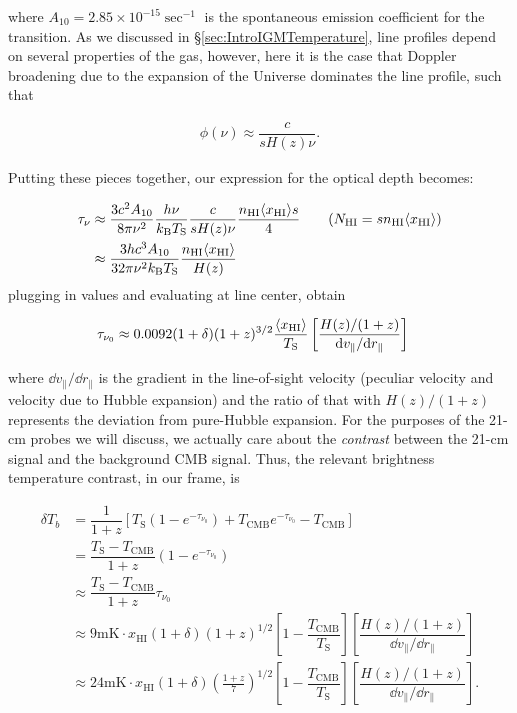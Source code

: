 where $A_{10} = 2.85 \times 10^{-15}\sec^{-1}$ is the spontaneous emission coefficient for the transition. As we discussed in \S \ref{sec:IntroIGMTemperature}, line profiles depend on several properties of the gas, however, here it is the case that Doppler broadening due to the expansion of the Universe dominates the line profile, such that

\begin{align}
\phi(\nu) \approx \dfrac{c}{s H(z) \nu}.
\end{align}

Putting these pieces together, our expression for the optical depth becomes:

\begin{align}
\tau_{\nu} &\approx \dfrac{3c^2 A_{10}}{8\pi \nu^{2}} \dfrac{h \nu}{k_{\text{B}}T_{\text{S}}} \dfrac{c}{s H(z) \nu} \dfrac{n_{\text{HI}}\langle x_{\text{HI}}\rangle s}{4} \tag{$N_{\text{HI}} = s n_{\text{HI}}\axhi$}\\
&\approx \dfrac{3hc^3 A_{10}}{32\pi \nu^2 k_{\text{B}}T_{\text{S}}} \dfrac{n_{\text{HI}}\axhi}{H(z)}
\end{align}
plugging in values and evaluating at line center, \cite{Furlanetto2006} obtain

\begin{align}
\tau_{\nu_{0}} &\approx 0.0092 (1+\delta)(1+z)^{3/2}\dfrac{\langle x_{\text{HI}}\rangle}{T_{\text{S}}}\left[ \dfrac{H(z)/(1+z)}{\text{d} v_{\parallel}/\text{d} r_{\parallel}} \right] 
\end{align}

where $\dd v_{\parallel}/\dd r_{\parallel}$ is the gradient in the line-of-sight velocity (peculiar velocity and velocity due to Hubble expansion) and the ratio of that with $H(z)/(1+z)$ represents the deviation from pure-Hubble expansion. For the purposes of the 21-cm probes we will discuss, we actually care about the \textit{contrast} between the 21-cm signal and the background CMB signal. Thus, the relevant brightness temperature contrast, in our frame, is 

\begin{align}
\delta T_{b} &= \dfrac{1}{1+z}\left[ T_{\text{S}}(1-e^{-\tau_{\nu_{0}}}) + T_{\text{CMB}}e^{-\tau_{\nu_{0}}} - T_{\text{CMB}} \right] \\
&= \dfrac{T_{\text{S}}-T_{\text{CMB}}}{1+z} (1 - e^{-\tau_{\nu_{0}}}) \\
&\approx \dfrac{T_{\text{S}}-T_{\text{CMB}}}{1+z} \tau_{\nu_{0}} \\ 
&\approx 9\text{mK}\cdot x_{\text{HI}}(1+\delta)(1+z)^{1/2}\left[ 1 - \dfrac{T_{\text{CMB}}}{T_{\text{S}}} \right] \left[ \dfrac{H(z)/(1+z)}{\dd v_{\parallel}/ \dd r_{\parallel}} \right] \\ 
&\approx 24 \text{mK}\cdot x_{\text{HI}}(1+\delta)\left(\frac{1+z}{7}\right)^{1/2}\left[ 1 - \dfrac{T_{\text{CMB}}}{T_{\text{S}}} \right] \left[ \dfrac{H(z)/(1+z)}{\dd v_{\parallel}/ \dd r_{\parallel}} \right].
\end{align}

